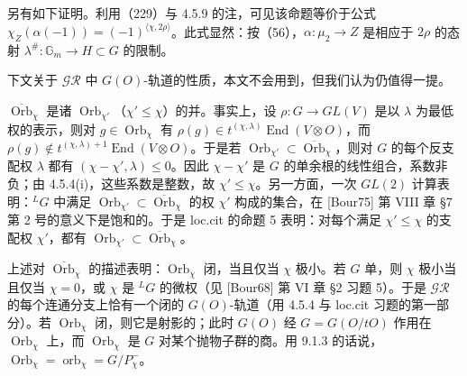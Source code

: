 另有如下证明。利用（229）与 4.5.9 的注，可见该命题等价于公式 $\chi_Z(\alpha(-1))=(-1)^{\langle\chi,2\rho\rangle}$。此式显然：按（56），$\alpha:\mu_2\to Z$ 是相应于 $2\rho$ 的态射 $\lambda^{\#}:\mathbb{G}_m\to H\subset G$ 的限制。

 下文关于 $\mathcal{GR}$ 中 $G(O)$-轨道的性质，本文不会用到，但我们认为仍值得一提。

$\overline{\operatorname{Orb}}_\chi$ 是诸 $\operatorname{Orb}_{\chi'}$（$\chi'\le\chi$）的并。事实上，设 $\rho:G\to GL(V)$ 是以 $\lambda$ 为最低权的表示，则对 $g\in\operatorname{Orb}_\chi$ 有 $\rho(g)\in t^{(\chi,\lambda)}\operatorname{End}(V\otimes O)$，而 $\rho(g)\notin t^{(\chi,\lambda)+1}\operatorname{End}(V\otimes O)$。于是若 $\operatorname{Orb}_{\chi'}\subset\overline{\operatorname{Orb}}_\chi$，则对 $G$ 的每个反支配权 $\lambda$ 都有 $(\chi-\chi',\lambda)\le0$。因此 $\chi-\chi'$ 是 $G$ 的单余根的线性组合，系数非负；由 4.5.4(i)，这些系数是整数，故 $\chi'\le\chi$。另一方面，一次 $GL(2)$ 计算表明：${}^{L}G$ 中满足 $\operatorname{Orb}_{\chi'}\subset\overline{\operatorname{Orb}}_\chi$ 的权 $\chi'$ 构成的集合，在 [Bour75] 第 VIII 章 §7 第 2 号的意义下是饱和的。于是 loc.cit 的命题 5 表明：对每个满足 $\chi'\le\chi$ 的支配权 $\chi'$，都有 $\operatorname{Orb}_{\chi'}\subset\overline{\operatorname{Orb}}_\chi$。

上述对 $\overline{\operatorname{Orb}}_\chi$ 的描述表明：$\operatorname{Orb}_\chi$ 闭，当且仅当 $\chi$ 极小。若 $G$ 单，则 $\chi$ 极小当且仅当 $\chi=0$，或 $\chi$ 是 ${}^{L}G$ 的微权（见 [Bour68] 第 VI 章 §2 习题 5）。于是 $\mathcal{GR}$ 的每个连通分支上恰有一个闭的 $G(O)$-轨道（用 4.5.4 与 loc.cit 习题的第一部分）。若 $\operatorname{Orb}_\chi$ 闭，则它是射影的；此时 $G(O)$ 经 $G=G(O/tO)$ 作用在 $\operatorname{Orb}_\chi$ 上，而 $\operatorname{Orb}_\chi$ 是 $G$ 对某个抛物子群的商。用 9.1.3 的话说，$\operatorname{Orb}_\chi=\operatorname{orb}_\chi=G/P_\chi^-$。


